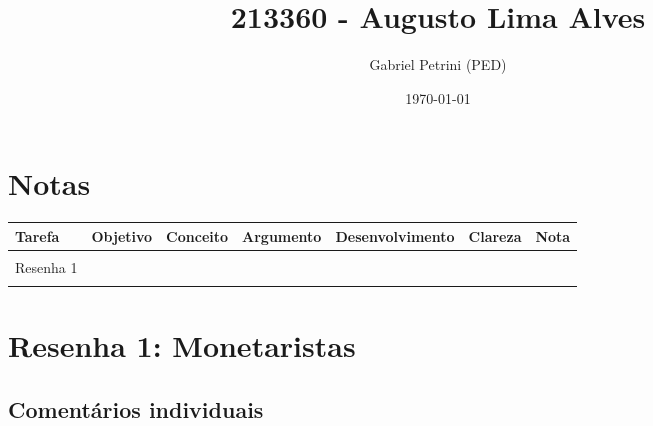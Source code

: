 \documentclass[11pt]{article}
\author{Gabriel Petrini (PED)}
\date{\today}
\title{213360 - Augusto Lima Alves}
\begin{document}
\maketitle


\section*{Notas}
\label{sec:org87659aa}

\begin{center}
\begin{tabular}{lllllll}
Tarefa & Objetivo & Conceito & Argumento & Desenvolvimento & Clareza & Nota\\
\hline
 &  &  &  &  &  & \\
Resenha 1 &  &  &  &  &  & \\
 &  &  &  &  &  & \\
\end{tabular}
\end{center}

\section*{Resenha 1: Monetaristas}
\label{sec:org5552551}
\subsection*{Comentários individuais}
\label{sec:org86c7d4d}
\end{document}
